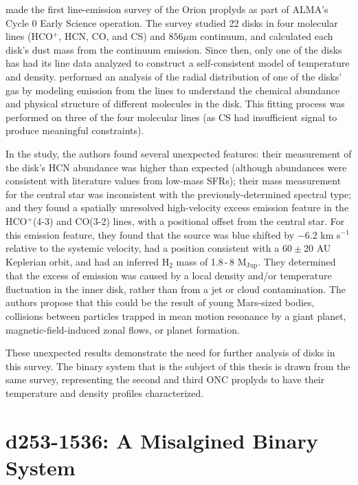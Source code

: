 \citet{Mann2014} made the first line-emission survey of the Orion proplyds as part of ALMA's Cycle 0 Early Science operation. The survey studied 22 disks in four molecular lines (HCO$^+$, HCN, CO, and CS) and $856 \mu$m continuum, and calculated each disk's dust mass from the continuum emission. Since then, only one of the disks has had its line data analyzed to construct a self-consistent model of temperature and density. \citet{Factor2017} performed an analysis of the radial distribution of one of the disks' gas by modeling emission from the lines to understand the chemical abundance and physical structure of different molecules in the disk. This fitting process was performed on three of the four molecular lines (as CS had insufficient signal to produce meaningful constraints).

In the study, the authors found several unexpected features: their measurement of the disk's HCN abundance was higher than expected (although \hco abundances were consistent with literature values from low-mass SFRs); their mass measurement for the central star was inconsistent with the previously-determined spectral type; and they found a spatially unresolved high-velocity excess emission feature in the HCO$^+$(4-3) and CO(3-2) lines, with a positional offset from the central star. For this emission feature, they found that the source was blue shifted by $-6.2$ km s$^{-1}$ relative to the systemic velocity, had a position consistent with a $60\pm20$ AU Keplerian orbit, and had an inferred H$_2$ mass of 1.8\,-\,8 M$_\text{Jup}$. They determined that the excess of emission was caused by a local density and/or temperature fluctuation in the inner disk, rather than from a jet or cloud contamination. The authors propose that this could be the result of young Mars-sized bodies, collisions between particles trapped in mean motion resonance by a giant planet, magnetic-field-induced zonal flows, or planet formation.


These unexpected results demonstrate the need for further analysis of disks in this survey. The binary system that is the subject of this thesis is drawn from the same survey, representing the second and third ONC proplyds to have their temperature and density profiles characterized.





\section{d253-1536: A Misalgined Binary System}

